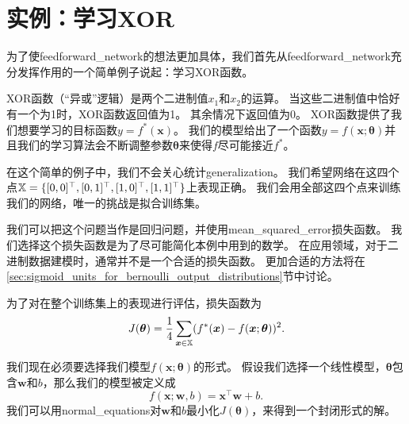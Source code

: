 \section{实例：学习XOR}
\label{sec:example_learning_xor}

为了使\gls{feedforward_network}的想法更加具体，我们首先从\gls{feedforward_network}充分发挥作用的一个简单例子说起：学习XOR函数。

XOR函数（``异或''逻辑）是两个二进制值$x_1$和$x_2$的运算。
当这些二进制值中恰好有一个为1时，XOR函数返回值为1。
其余情况下返回值为0。
XOR函数提供了我们想要学习的目标函数$y = f^*(\bm{x})$。
我们的模型给出了一个函数$y=f(\bm{x}; \bm{\theta})$并且我们的学习算法会不断调整参数$\bm{\theta}$来使得$f$尽可能接近$f^*$。

在这个简单的例子中，我们不会关心统计\gls{generalization}。
我们希望网络在这四个点$\mathbb{X} =\{[0, 0]^\top, [0, 1]^\top, [1, 0]^\top, [1, 1]^\top\}$上表现正确。
我们会用全部这四个点来训练我们的网络，唯一的挑战是拟合训练集。

我们可以把这个问题当作是回归问题，并使用\gls{mean_squared_error}损失函数。
我们选择这个损失函数是为了尽可能简化本例中用到的数学。
在应用领域，对于二进制数据建模时，通常并不是一个合适的损失函数。
更加合适的方法将在\ref{sec:sigmoid_units_for_bernoulli_output_distributions}节中讨论。


为了对在整个训练集上的表现进行评估，损失函数为
\begin{equation}
J(\bm{\theta}) = \frac{1}{4} \sum_{\bm{x}\in \mathbb{X}} (f^*(\bm{x}) - f(\bm{x}; \bm{\theta}))^2.
\end{equation}

我们现在必须要选择我们模型$f(\bm{x}; \bm{\theta})$的形式。
假设我们选择一个线性模型，$\bm{\theta}$包含$\bm{w}$和$b$，那么我们的模型被定义成
\begin{equation}
f(\bm{x}; \bm{w}, b) = \bm{x}^\top \bm{w} + b.
\end{equation}
我们可以用\gls{normal_equations}对$\bm{w}$和$b$最小化$J(\bm{\theta})$，来得到一个封闭形式的解。

